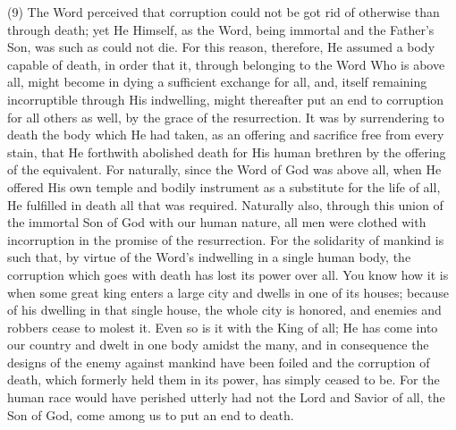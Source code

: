 \documentclass[9pt, twocolumn, oneside, a4paper]{memoir}
\begin{document}
\textsc{(9)} The Word perceived that corruption could not be got       rid of otherwise than through death; yet He Himself, as the Word, being immortal       and the Father's Son, was such as could not die. For this reason, therefore, He       assumed a body capable of death, in order that it, through belonging to the Word       Who is above all, might become in dying a sufficient exchange for all, and,       itself remaining incorruptible through His indwelling, might thereafter put an       end to corruption for all others as well, by the grace of the resurrection. It       was by surrendering to death the body which He had taken, as an offering and       sacrifice free from every stain, that He forthwith abolished death for His human       brethren by the offering of the equivalent. For naturally, since the Word of God       was above all, when He offered His own temple and bodily instrument as a       substitute for the life of all, He fulfilled in death all that was required.       Naturally also, through this union of the immortal Son of God with our human       nature, all men were clothed with incorruption in the promise of the       resurrection. For the solidarity of mankind is such that, by virtue of the       Word's indwelling in a single human body, the corruption which goes with death       has lost its power over all. You know how it is when some great king enters a       large city and dwells in one of its houses; because of his dwelling in that       single house, the whole city is honored, and enemies and robbers cease to molest       it. Even so is it with the King of all; He has come into our country and dwelt       in one body amidst the many, and in consequence the designs of the enemy against       mankind have been foiled and the corruption of death, which formerly held them       in its power, has simply ceased to be. For the human race would have perished       utterly had not the Lord and Savior of all, the Son of God, come among us to put       an end to death.   
\end{document}
